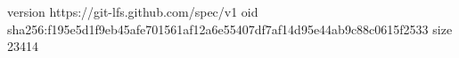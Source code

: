 version https://git-lfs.github.com/spec/v1
oid sha256:f195e5d1f9eb45afe701561af12a6e55407df7af14d95e44ab9c88c0615f2533
size 23414
